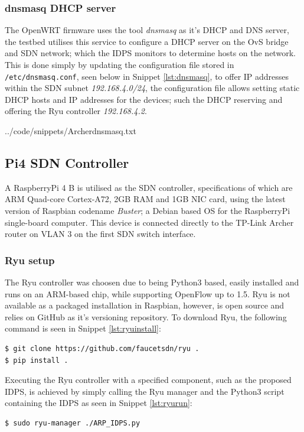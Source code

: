 \documentclass[12pt, oneside]{book}
\begin{document}
\subsubsection{dnsmasq DHCP server}
The OpenWRT firmware uses the tool \emph{dnsmasq}\cite{kelley} as it's DHCP and DNS server, the testbed utilises
this service to configure a DHCP server on the OvS bridge and SDN network;
which the IDPS monitors to determine hosts on the network.
This is done simply by updating the configuration file stored in \lstinline{/etc/dnsmasq.conf}, seen below in Snippet \ref{lst:dnsmasq},
to offer IP addresses within the SDN
subnet \emph{192.168.4.0/24}, the configuration file allows setting static DHCP hosts and IP addresses for the devices;
such the DHCP reserving and offering the Ryu controller \emph{192.168.4.2}.


{../code/snippets/Archerdnsmasq.txt}


\subsection{Pi4 SDN Controller}
A RaspberryPi 4 B is utilised as the SDN controller, specifications of which are ARM Quad-core Cortex-A72, 2GB RAM
and 1GB NIC card,
using the latest version of Raspbian codename \emph{Buster}; a Debian based OS for the RaspberryPi single-board computer\cite{raspberrypi4}.
This device is connected directly to the TP-Link Archer router on VLAN 3 on the first SDN switch interface.


\subsubsection{Ryu setup}
The Ryu controller was choosen due to being Python3 based, easily installed and runs on an ARM-based chip,
while supporting OpenFlow up to 1.5.
Ryu is not available as a packaged installation in Raspbian, however, is 
open source and relies on GitHub as it's versioning repository.
To download Ryu, the following command is seen in Snippet \ref{lst:ryuinstall}:

\begin{lstlisting}[language=Bash,caption={Ryu Installation},captionpos=b,label={lst:ryuinstall}]
$ git clone https://github.com/faucetsdn/ryu .
$ pip install .
\end{lstlisting}

Executing the Ryu controller with a specified component, such as the proposed IDPS, is achieved by simply calling the Ryu 
manager and the Python3 script containing the IDPS as seen in Snippet \ref{lst:ryurun}:
\begin{lstlisting}[language=Bash,caption={Ryu Execution},captionpos=b,label={lst:ryurun}]
$ sudo ryu-manager ./ARP_IDPS.py
\end{lstlisting}
\end{document}
